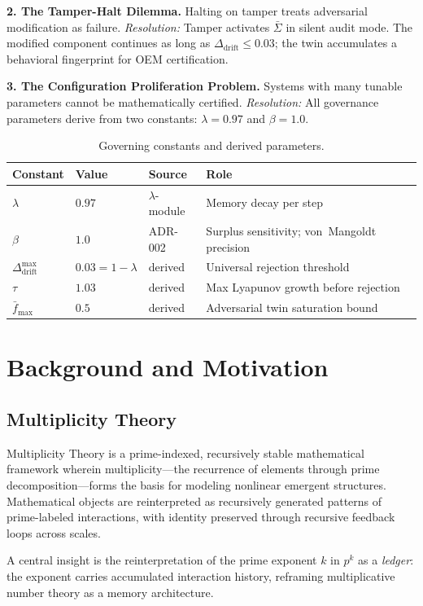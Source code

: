 \documentclass[12pt,letterpaper]{article}
\begin{document}
\textbf{2. The Tamper-Halt Dilemma.}
Halting on tamper treats adversarial modification as failure.
\emph{Resolution:} Tamper activates $\bar\Sigma$ in silent audit mode.
The modified component continues as long as
$\Delta_{\mathrm{drift}}\leq 0.03$;
the twin accumulates a behavioral fingerprint for OEM certification.

\textbf{3. The Configuration Proliferation Problem.}
Systems with many tunable parameters cannot be mathematically certified.
\emph{Resolution:} All governance parameters derive from two constants:
$\lambda=0.97$ and $\beta=1.0$.

\begin{table}[H]\centering
\caption{Governing constants and derived parameters.}
\begin{tabular}{llll}\toprule
\textbf{Constant} & \textbf{Value} & \textbf{Source} & \textbf{Role}\\\midrule
$\lambda$ & $0.97$ & $\lambda$-module & Memory decay per step \\
$\beta$   & $1.0$  & ADR-002 & Surplus sensitivity; von~Mangoldt precision \\
\midrule
$\Delta_{\mathrm{drift}}^{\max}$ & $0.03=1-\lambda$ & derived & Universal rejection threshold \\
$\tau$ & $1.03$ & derived & Max Lyapunov growth before rejection \\
$\bar f_{\max}$ & $0.5$ & derived & Adversarial twin saturation bound \\
\bottomrule\end{tabular}
\end{table}

\section{Background and Motivation}\label{sec:background}

\subsection{Multiplicity Theory}
Multiplicity Theory is a prime-indexed, recursively stable mathematical
framework wherein multiplicity---the recurrence of elements through prime
decomposition---forms the basis for modeling nonlinear emergent structures.
Mathematical objects are reinterpreted as recursively generated patterns of
prime-labeled interactions, with identity preserved through recursive feedback
loops across scales.

A central insight is the reinterpretation of the prime exponent $k$ in $p^k$
as a \emph{ledger}: the exponent carries accumulated interaction history,
reframing multiplicative number theory as a memory architecture.
\end{document}
